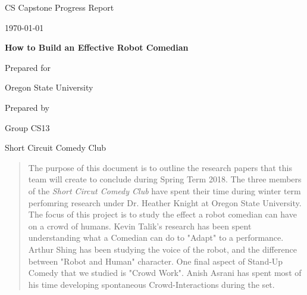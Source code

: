 \documentclass[onecolumn, draftclsnofoot,10pt, compsoc]{IEEEtran}
\def \CapstoneTeamName{	Short Circuit Comedy Club	}
\def \CapstoneTeamNumber{		CS13}
\def \CapstoneProjectName{		How to Build an Effective Robot Comedian}
\def \CapstoneSponsorCompany{	Oregon State University}
\def \DocType{		%
				Progress Report
				}
\begin{document}
\begin{titlepage}
    \begin{singlespace}
        \hfill 
        \par\vspace{.2in}
        \centering
        \scshape{
            \huge CS Capstone \DocType \par
            {\large\today}\par
            \vspace{.5in}
            \textbf{\Huge\CapstoneProjectName}\par
            \vfill
            {\large Prepared for}\par
            \Huge \CapstoneSponsorCompany\par
            \vspace{5pt}
            {\large Prepared by }\par
            Group\CapstoneTeamNumber\par
            \CapstoneTeamName\par 
            \vspace{5pt}
            \vspace{20pt}
        }
        \begin{abstract}
			The purpose of this document is to outline the research papers that this team will create to conclude during Spring Term 2018. 
			The three members of the \textit{Short Circut Comedy Club} have spent their time during winter term perfomring research under Dr. Heather Knight at Oregon State University.
			The focus of this project is to study the effect a robot comedian can have on a crowd of humans.
			Kevin Talik's research has been spent understanding what a Comedian can do to "Adapt" to a performance. 
			Arthur Shing has been studying the voice of the robot, and the difference between "Robot and Human" character.
			One final aspect of Stand-Up Comedy that we studied is "Crowd Work". Anish Asrani has spent most of his time developing spontaneous Crowd-Interactions during the set.
        \end{abstract}     
    \end{singlespace}
\end{titlepage}
\newpage
{}
\tableofcontents
\clearpage
\end{document}
